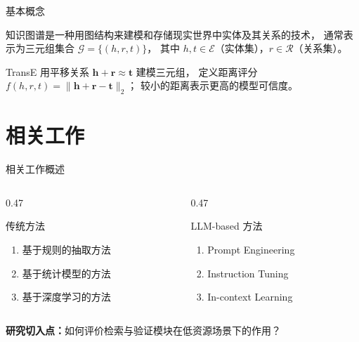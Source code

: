 \documentclass[aspectratio=169, UTF8]{ctexbeamer}
\begin{document}
\begin{frame}{基本概念}
  \begin{nkdefinition}[title={知识图谱 (Knowledge Graph)}]
    知识图谱是一种用图结构来建模和存储现实世界中实体及其关系的技术，
    通常表示为三元组集合 $\mathcal{G} = \{(h, r, t)\}$，
    其中 $h, t \in \mathcal{E}$（实体集），$r \in \mathcal{R}$（关系集）。
  \end{nkdefinition}

  \vspace{0.5em}

  \begin{nkbox}[title={TransE 评分函数}]
    TransE 用平移关系 $\bm{h}+\bm{r}\approx\bm{t}$ 建模三元组，
    定义距离评分 $f(h,r,t)=\|\bm{h}+\bm{r}-\bm{t}\|_2$；
    较小的距离表示更高的模型可信度。
  \end{nkbox}
\end{frame}

\section{相关工作}

\begin{frame}{相关工作概述}
  \begin{columns}[T]
    \begin{column}{0.47\textwidth}
      \begin{block}{传统方法}
        \begin{enumerate}
          \item 基于规则的抽取方法
          \item 基于统计模型的方法
          \item 基于深度学习的方法
        \end{enumerate}
      \end{block}
    \end{column}
    \begin{column}{0.47\textwidth}
      \begin{exampleblock}{LLM-based 方法}
        \begin{enumerate}
          \item Prompt Engineering
          \item Instruction Tuning
          \item In-context Learning
        \end{enumerate}
      \end{exampleblock}
    \end{column}
  \end{columns}

  \vspace{0.5em}

  \begin{nkhighlight}
    \textbf{研究切入点：}如何评价检索与验证模块在\alert{低资源场景}下的作用？
  \end{nkhighlight}
\end{frame}
\end{document}
